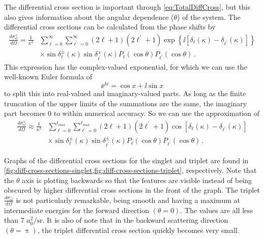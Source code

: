 \documentclass[Dissertation.tex]{subfiles}
\begin{document}
The differential cross section is important through \cref{eq:TotalDiffCross},
but this also gives information about the angular dependence ($\theta$) of the
system. The differential cross sections can be calculated from the phase shifts by
\begin{align}
\label{eq:DiffCross}
\nonumber \frac{d\sigma_{el}^\pm}{d\Omega} = \frac{1}{\kappa^2} & \sum_{\ell=0}^\infty \sum_{\ell^\prime=0}^\infty (2\ell+1)(2\ell^\prime+1) \exp\left\{\ii \left[\delta_\ell(\kappa) - \delta_{\ell^\prime}(\kappa) \right] \right\} \\
& \times \sin\delta_\ell^\pm(\kappa) \sin\delta_{\ell^\prime}^\pm(\kappa) P_\ell(\cos\theta) P_{\ell^\prime}(\cos\theta)\,.
\end{align}
This expression has the complex-valued exponential, for which we can use the
well-known Euler formula of
\begin{equation}
\label{eq:ComplexExp}
\ee^{\ii x} = \cos x + \ii \sin x
\end{equation}
to split this into real-valued and imaginary-valued parts. As long as the
finite truncation of the upper limits of the summations are the same, the
imaginary part becomes 0 to within numerical accuracy. So we can use the
approximation of
\begin{align}
\label{eq:DiffCross1}
\nonumber \frac{d\sigma_{el}^\pm}{d\Omega} \approx \frac{1}{\kappa^2} & \sum_{\ell=0}^{\ell_{max}} \sum_{\ell^\prime=0}^{\ell_{max}} (2\ell+1)(2\ell^\prime+1) \cos \left[\delta_\ell(\kappa) - \delta_{\ell^\prime}(\kappa) \right] \\
& \times \sin\delta_\ell^\pm(\kappa) \sin\delta_{\ell^\prime}^\pm(\kappa) P_\ell(\cos\theta) P_{\ell^\prime}(\cos\theta)\,.
\end{align}

Graphs of the differential cross sections for the singlet and triplet are found
in \cref{fig:diff-cross-sections-singlet,fig:diff-cross-sections-triplet},
respectively. Note that the $\theta$ axis is plotting backwards so that the
features are visible instead of being obscured by higher differential cross
sections in the front of the graph.
The triplet $\frac{d\sigma_{el}^-}{d\Omega}$ is not particularly
remarkable, being smooth and having a maximum at intermediate energies for the
forward direction $(\theta = 0)$. The values are all less than 7 $a_0^2/\textrm{sr}$.
It is also of note that in the backward scattering direction $(\theta = \uppi)$,
the triplet differential cross section quickly becomes very small.
\end{document}
